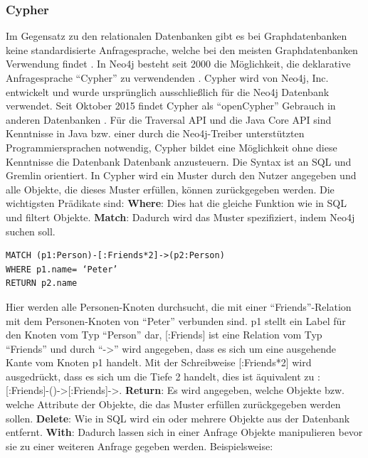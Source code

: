 \subsubsection{Cypher}
Im Gegensatz zu den relationalen Datenbanken gibt es bei Graphdatenbanken keine standardisierte Anfragesprache, welche bei den meisten Graphdatenbanken Verwendung findet \parencite{han2011survey}. In Neo4j besteht seit 2000 die Möglichkeit, die deklarative Anfragesprache “Cypher” zu verwendenden  \parencite{francis2018cypher}. Cypher wird von Neo4j, Inc. entwickelt und wurde ursprünglich ausschließlich für die Neo4j Datenbank verwendet. Seit Oktober 2015  findet Cypher als “openCypher” Gebrauch in anderen Datenbanken \parencite{francis2018cypher}. Für die Traversal API und die Java Core API sind Kenntnisse in Java bzw. einer durch die Neo4j-Treiber unterstützten Programmiersprachen notwendig, Cypher bildet eine Möglichkeit ohne diese Kenntnisse die Datenbank  Datenbank anzusteuern\parencite{vukotic2015neo4j}. Die Syntax ist an SQL und Gremlin orientiert. In Cypher wird ein Muster durch den Nutzer angegeben und alle Objekte, die dieses Muster erfüllen, können zurückgegeben werden. Die wichtigsten  Prädikate sind: \newline
\textbf{Where}: Dies hat die gleiche Funktion wie in SQL und filtert Objekte. \newline
\textbf{Match}: Dadurch wird das Muster spezifiziert, indem Neo4j suchen soll.
\begin{Verbatim}[frame=single]
MATCH (p1:Person)-[:Friends*2]->(p2:Person) 
WHERE p1.name= ‘Peter’ 
RETURN p2.name
\end{Verbatim}
Hier werden alle Personen-Knoten durchsucht, die mit einer “Friends”-Relation mit dem Personen-Knoten von “Peter” verbunden sind. p1 stellt ein Label für den Knoten vom Typ “Person” dar, [:Friends] ist eine Relation vom Typ “Friends” und durch “->” wird angegeben, dass es sich um eine ausgehende Kante vom Knoten p1 handelt. Mit der Schreibweise [:Friends*2] wird ausgedrückt, dass es sich um die Tiefe 2 handelt, dies ist äquivalent zu : [:Friends]-()->[:Friends]->. \newline
\textbf{Return}: Es wird angegeben, welche Objekte bzw. welche Attribute der Objekte, die das Muster erfüllen zurückgegeben werden sollen.\newline
\textbf{Delete}: Wie in SQL  wird ein  oder mehrere Objekte aus der Datenbank entfernt.\newline
\textbf{With}: Dadurch lassen sich in einer Anfrage Objekte manipulieren bevor sie zu einer weiteren Anfrage gegeben werden. Beispielsweise:
